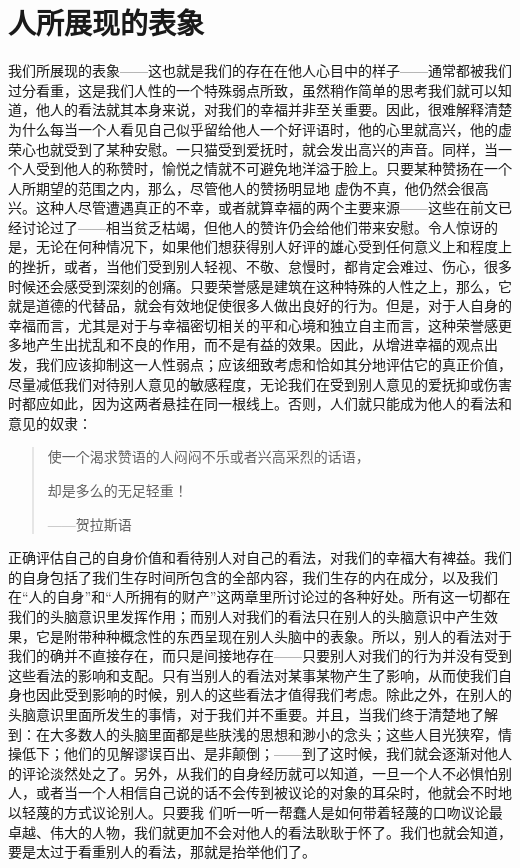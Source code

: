 \documentclass[12pt,oneside]{book}
\begin{document}
\chapter{人所展现的表象 }
我们所展现的表象——这也就是我们的存在在他人心目中的样子——通常都被我们过分看重，这是我们人性的一个特殊弱点所致，虽然稍作简单的思考我们就可以知道，他人的看法就其本身来说，对我们的幸福并非至关重要。因此，很难解释清楚为什么每当一个人看见自己似乎留给他人一个好评语时，他的心里就高兴，他的虚荣心也就受到了某种安慰。一只猫受到爱抚时，就会发出高兴的声音。同样，当一个人受到他人的称赞时，愉悦之情就不可避免地洋溢于脸上。只要某种赞扬在一个人所期望的范围之内，那么，尽管他人的赞扬明显地
虚伪不真，他仍然会很高兴。这种人尽管遭遇真正的不幸，或者就算幸福的两个主要来源——这些在前文已经讨论过了——相当贫乏枯竭，但他人的赞许仍会给他们带来安慰。令人惊讶的是，无论在何种情况下，如果他们想获得别人好评的雄心受到任何意义上和程度上的挫折，或者，当他们受到别人轻视、不敬、怠慢时，都肯定会难过、伤心，很多时候还会感受到深刻的创痛。只要荣誉感是建筑在这种特殊的人性之上，那么，它就是道德的代替品，就会有效地促使很多人做出良好的行为。但是，对于人自身的幸福而言，尤其是对于与幸福密切相关的平和心境和独立自主而言，这种荣誉感更多地产生出扰乱和不良的作用，而不是有益的效果。因此，从增进幸福的观点出发，我们应该抑制这一人性弱点；应该细致考虑和恰如其分地评估它的真正价值，尽量减低我们对待别人意见的敏感程度，无论我们在受到别人意见的爱抚抑或伤害时都应如此，因为这两者悬挂在同一根线上。否则，人们就只能成为他人的看法和意见的奴隶： 

 
\begin{quotation}
使一个渴求赞语的人闷闷不乐或者兴高采烈的话语， 

却是多么的无足轻重！ 

——贺拉斯语 
\end{quotation}


正确评估自己的自身价值和看待别人对自己的看法，对我们的幸福大有裨益。我们的自身包括了我们生存时间所包含的全部内容，我们生存的内在成分，以及我们在“人的自身”和“人所拥有的财产”这两章里所讨论过的各种好处。所有这一切都在我们的头脑意识里发挥作用；而别人对我们的看法只在别人的头脑意识中产生效果，它是附带种种概念性的东西呈现在别人头脑中的表象。所以，别人的看法对于我们的确并不直接存在，而只是间接地存在——只要别人对我们的行为并没有受到这些看法的影响和支配。只有当别人的看法对某事某物产生了影响，从而使我们自身也因此受到影响的时候，别人的这些看法才值得我们考虑。除此之外，在别人的头脑意识里面所发生的事情，对于我们并不重要。并且，当我们终于清楚地了解到：在大多数人的头脑里面都是些肤浅的思想和渺小的念头；这些人目光狭窄，情操低下；他们的见解谬误百出、是非颠倒；——到了这时候，我们就会逐渐对他人的评论淡然处之了。另外，从我们的自身经历就可以知道，一旦一个人不必惧怕别人，或者当一个人相信自己说的话不会传到被议论的对象的耳朵时，他就会不时地以轻蔑的方式议论别人。只要我
们听一听一帮蠢人是如何带着轻蔑的口吻议论最卓越、伟大的人物，我们就更加不会对他人的看法耿耿于怀了。我们也就会知道，要是太过于看重别人的看法，那就是抬举他们了。 
\end{document}
